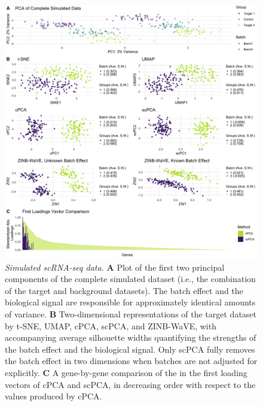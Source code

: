 \begin{figure}[!htbp]
  \centering
  \includegraphics[width = \textwidth]{figures/sim_results}
  \caption{
  {\em Simulated scRNA-seq data.}
  \textbf{A} Plot of the first two principal components of the complete simulated dataset (i.e., the combination of the target and background datasets). The batch effect and the biological signal are responsible for approximately identical amounts of variance. \textbf{B} Two-dimensional representations of the target dataset by t-SNE, UMAP, cPCA, scPCA, and ZINB-WaVE, with accompanying average silhouette widths quantifying the strengths of the batch effect and the biological signal. Only scPCA fully removes the batch effect in two dimensions when batches are not adjusted for explicitly. \textbf{C} A gene-by-gene comparison of the  in the first loading vectors of cPCA and scPCA, in decreasing order with respect to the values produced by cPCA.}
  \label{fig:sim}
\end{figure}

